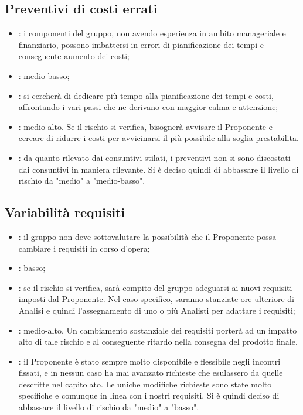\subsection{Preventivi di costi errati}
\begin{itemize}
\item {}: i componenti del gruppo, non avendo esperienza in ambito manageriale e finanziario, possono imbattersi in errori di pianificazione dei tempi e conseguente aumento dei costi;
\item {}: medio-basso;
\item {}: si cercherà di dedicare più tempo alla pianificazione dei tempi e costi, affrontando i vari passi che ne derivano con maggior calma e attenzione;
\item {}: medio-alto. Se il rischio si verifica, bisognerà avvisare il Proponente e cercare di ridurre i costi per avvicinarsi il più possibile alla soglia prestabilita.
\item {}: da quanto rilevato dai consuntivi stilati, i preventivi non si sono discostati dai consuntivi in maniera rilevante. Si è deciso quindi di abbassare il livello di rischio da "medio" a "medio-basso".
\end{itemize}

\subsection{Variabilità requisiti}
\begin{itemize}
\item {}: il gruppo non deve sottovalutare la possibilità che il Proponente possa cambiare i requisiti in corso d'opera;
\item {}: basso;
\item {}: se il rischio si verifica, sarà compito del gruppo adeguarsi ai nuovi requisiti imposti dal Proponente. Nel caso specifico, saranno stanziate ore ulteriore di Analisi e quindi l'assegnamento di uno o più Analisti per adattare i requisiti;
\item {}: medio-alto. Un cambiamento sostanziale dei requisiti porterà ad un impatto alto di tale rischio e al conseguente ritardo nella consegna del prodotto finale.
\item {}: il Proponente è stato sempre molto disponibile e flessibile negli incontri fissati, e in nessun caso ha mai avanzato richieste che esulassero da quelle descritte nel capitolato. Le uniche modifiche richieste sono state molto specifiche e comunque in linea con i nostri requisiti. Si è quindi deciso di abbassare il livello di rischio da "medio" a "basso".
\end{itemize}

